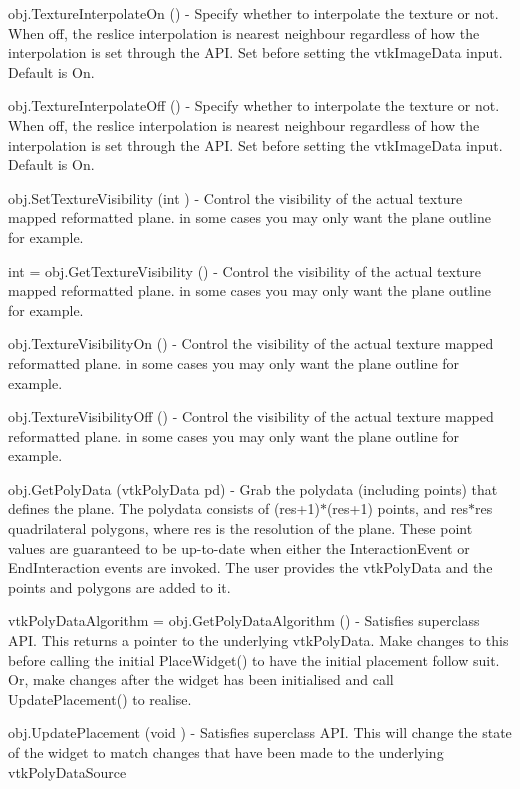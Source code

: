 \begin{DoxyItemize}
\item {\ttfamily obj.\-Texture\-Interpolate\-On ()} -\/ Specify whether to interpolate the texture or not. When off, the reslice interpolation is nearest neighbour regardless of how the interpolation is set through the A\-P\-I. Set before setting the vtk\-Image\-Data input. Default is On.  
\item {\ttfamily obj.\-Texture\-Interpolate\-Off ()} -\/ Specify whether to interpolate the texture or not. When off, the reslice interpolation is nearest neighbour regardless of how the interpolation is set through the A\-P\-I. Set before setting the vtk\-Image\-Data input. Default is On.  
\item {\ttfamily obj.\-Set\-Texture\-Visibility (int )} -\/ Control the visibility of the actual texture mapped reformatted plane. in some cases you may only want the plane outline for example.  
\item {\ttfamily int = obj.\-Get\-Texture\-Visibility ()} -\/ Control the visibility of the actual texture mapped reformatted plane. in some cases you may only want the plane outline for example.  
\item {\ttfamily obj.\-Texture\-Visibility\-On ()} -\/ Control the visibility of the actual texture mapped reformatted plane. in some cases you may only want the plane outline for example.  
\item {\ttfamily obj.\-Texture\-Visibility\-Off ()} -\/ Control the visibility of the actual texture mapped reformatted plane. in some cases you may only want the plane outline for example.  
\item {\ttfamily obj.\-Get\-Poly\-Data (vtk\-Poly\-Data pd)} -\/ Grab the polydata (including points) that defines the plane. The polydata consists of (res+1)$\ast$(res+1) points, and res$\ast$res quadrilateral polygons, where res is the resolution of the plane. These point values are guaranteed to be up-\/to-\/date when either the Interaction\-Event or End\-Interaction events are invoked. The user provides the vtk\-Poly\-Data and the points and polygons are added to it.  
\item {\ttfamily vtk\-Poly\-Data\-Algorithm = obj.\-Get\-Poly\-Data\-Algorithm ()} -\/ Satisfies superclass A\-P\-I. This returns a pointer to the underlying vtk\-Poly\-Data. Make changes to this before calling the initial Place\-Widget() to have the initial placement follow suit. Or, make changes after the widget has been initialised and call Update\-Placement() to realise.  
\item {\ttfamily obj.\-Update\-Placement (void )} -\/ Satisfies superclass A\-P\-I. This will change the state of the widget to match changes that have been made to the underlying vtk\-Poly\-Data\-Source  

\end{DoxyItemize}
